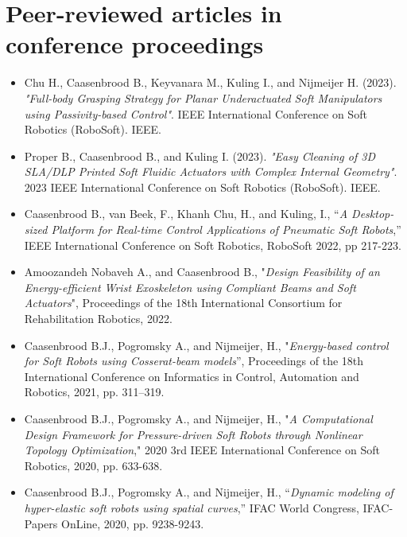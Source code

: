 \section*{Peer-reviewed articles in conference proceedings}
\begin{itemize}[leftmargin=2mm]
\small
\setlength\itemsep{0.0em}
\item Chu H., Caasenbrood B., Keyvanara M., Kuling I., and Nijmeijer H. (2023). \textit{"Full-body Grasping Strategy for Planar Underactuated Soft Manipulators using Passivity-based Control"}. IEEE International Conference on Soft Robotics (RoboSoft). IEEE.
\item Proper B., Caasenbrood B., and Kuling I. (2023). \textit{"Easy Cleaning of 3D SLA/DLP Printed Soft Fluidic Actuators with Complex Internal Geometry"}. 2023 IEEE International Conference on Soft Robotics (RoboSoft). IEEE.
\item Caasenbrood B., van Beek, F., Khanh Chu, H., and Kuling, I., “\textit{A Desktop-sized Platform for Real-time Control Applications of Pneumatic Soft Robots},” IEEE International Conference on Soft Robotics, RoboSoft 2022, pp 217-223.
\item Amoozandeh Nobaveh A., and Caasenbrood B., "\textit{Design Feasibility of an Energy-efficient Wrist Exoskeleton
using Compliant Beams and Soft Actuators}", Proceedings of the 18th International  Consortium for Rehabilitation Robotics, 2022.
\item  Caasenbrood B.J., Pogromsky A., and Nijmeijer, H., "\textit{Energy-based control for Soft Robots using Cosserat-beam models}”, Proceedings of the 18th International Conference on Informatics in Control, Automation and Robotics, 2021, pp. 311–319.
\item Caasenbrood B.J., Pogromsky A., and Nijmeijer, H., "\textit{A Computational Design Framework for Pressure-driven Soft Robots through Nonlinear Topology Optimization}," 2020 3rd IEEE International Conference on Soft Robotics, 2020, pp. 633-638.
\item Caasenbrood B.J., Pogromsky A., and Nijmeijer, H., “\textit{Dynamic modeling of hyper-elastic soft robots using spatial curves},” IFAC World Congress, IFAC-Papers OnLine, 2020, pp. 9238-9243.
\end{itemize}

